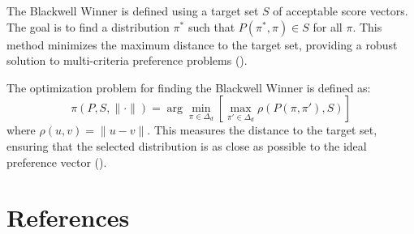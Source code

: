 \documentclass[
  letterpaper,
  DIV=11,
  numbers=noendperiod,
  oneside]{scrreprt}
\theoremstyle{remark}
\begin{document}
The Blackwell Winner is defined using a target set \(S\) of acceptable
score vectors. The goal is to find a distribution \(\pi^*\) such that
\(P(\pi^*, \pi) \in S\) for all \(\pi\). This method minimizes the
maximum distance to the target set, providing a robust solution to
multi-criteria preference problems
().

The optimization problem for finding the Blackwell Winner is defined as:
\[\pi(P, S, \|\cdot\|) = \arg \min_{\pi \in \Delta_d} \left[ \max_{\pi' \in \Delta_d} \rho(P(\pi, \pi'), S) \right]\]
where \(\rho(u, v) = \|u - v\|\). This measures the distance to the
target set, ensuring that the selected distribution is as close as
possible to the ideal preference vector
().

\section*{References}\label{bibliography-2}

\end{document}
